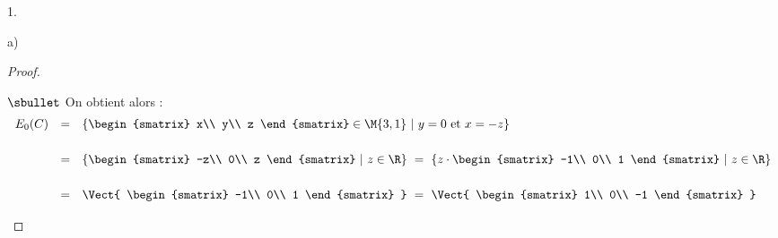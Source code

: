 \begin{noliste}{1.}
\begin{noliste}{a)}
\begin{proof}
\begin{noliste}{$\sbullet$}
	\noindent
	On obtient alors :
	\[
	\begin{array}{rcl}
          E_0(C) & = & \{
          \begin{smatrix}
            x\\
            y\\
            z
          \end{smatrix}
          \in \M{3,1} \ 
          \vert \
          y=0 \mbox{ et } x=-z \}
          \\[.6cm]
          & = & \{
          \begin{smatrix}
            -z\\
            0\\
            z
          \end{smatrix}
          \ | \ z\in\R
          \}
          \ = \ \{z \cdot
          \begin{smatrix}
            -1\\
            0\\
            1
          \end{smatrix}
          \ | \ z\in\R
          \}
          \\[.6cm]
          & = & \Vect{
            \begin{smatrix}
              -1\\
              0\\
              1
            \end{smatrix}
          }
          \ = \ \Vect{
            \begin{smatrix}
              1\\
              0\\
              -1
            \end{smatrix}
          }
	\end{array}
	\]
	

\end{noliste}
\end{proof}
\end{noliste}
\end{noliste}
